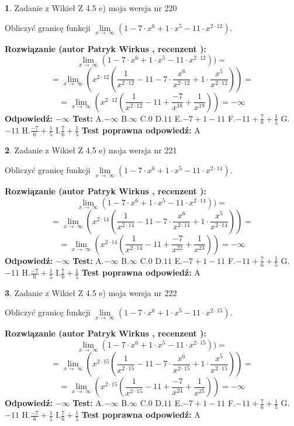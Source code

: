 \documentclass[12pt, a4paper]{article}
\theoremstyle{definition} %
\newtheorem{zad}{}
\newcommand{\zadStart}[1]{\begin{zad}#1\newline}
\newcommand{\zadStop}{\end{zad}}
\newcommand{\rozwStart}[2]{\noindent \textbf{Rozwiązanie (autor #1 , recenzent #2): }\newline}
\newcommand{\rozwStop}{\newline}
\newcommand{\odpStart}{\noindent \textbf{Odpowiedź:}\newline}
\newcommand{\odpStop}{\newline}
\newcommand{\testStart}{\noindent \textbf{Test:}\newline}
\newcommand{\testStop}{\newline}
\newcommand{\kluczStart}{\noindent \textbf{Test poprawna odpowiedź:}\newline}
\newcommand{\kluczStop}{\newline}
\begin{document}
\zadStart{Zadanie z Wikieł Z 4.5 e) moja wersja nr 220}



Obliczyć granicę funkcji  $\lim\limits_{x\to\ \infty}(1 - 7 \cdot x^{6}+1 \cdot x^{5}- 11 \cdot x^{2\cdot12})$.
\zadStop
\rozwStart{Patryk Wirkus}{}
$$\lim\limits_{x\to\ \infty}(1 - 7 \cdot x^{6}+1 \cdot x^{5}- 11 \cdot x^{2\cdot12}))=$$
$$=\lim\limits_{x\to\ \infty}(x^{2\cdot12}(\frac{1}{x^{2\cdot12}}-11 -7 \cdot \frac{x^{6}}{x^{2\cdot12}}+1 \cdot \frac{x^{5}}{x^{2\cdot12}}))=$$
$$=\lim\limits_{x\to\ \infty}(x^{2\cdot12}(\frac{1}{x^{2\cdot12}}-11 + \frac{-7}{x^{18}}+ \frac{1}{x^{19}}))=-\infty$$
\rozwStop
\odpStart
$-\infty$
\odpStop
\testStart
A.$-\infty$ B.$\infty$ C.$0$ D.$11$ E.$-7 + 1 - 11$
F.$-11+\frac{7}{6}+\frac{1}{5}$ G.$-11$
H.$\frac{-7}{6}+\frac{1}{5}$
I.$\frac{7}{6}+\frac{1}{5}$
\testStop
\kluczStart
A
\kluczStop



\zadStart{Zadanie z Wikieł Z 4.5 e) moja wersja nr 221}



Obliczyć granicę funkcji  $\lim\limits_{x\to\ \infty}(1 - 7 \cdot x^{6}+1 \cdot x^{5}- 11 \cdot x^{2\cdot14})$.
\zadStop
\rozwStart{Patryk Wirkus}{}
$$\lim\limits_{x\to\ \infty}(1 - 7 \cdot x^{6}+1 \cdot x^{5}- 11 \cdot x^{2\cdot14}))=$$
$$=\lim\limits_{x\to\ \infty}(x^{2\cdot14}(\frac{1}{x^{2\cdot14}}-11 -7 \cdot \frac{x^{6}}{x^{2\cdot14}}+1 \cdot \frac{x^{5}}{x^{2\cdot14}}))=$$
$$=\lim\limits_{x\to\ \infty}(x^{2\cdot14}(\frac{1}{x^{2\cdot14}}-11 + \frac{-7}{x^{22}}+ \frac{1}{x^{23}}))=-\infty$$
\rozwStop
\odpStart
$-\infty$
\odpStop
\testStart
A.$-\infty$ B.$\infty$ C.$0$ D.$11$ E.$-7 + 1 - 11$
F.$-11+\frac{7}{6}+\frac{1}{5}$ G.$-11$
H.$\frac{-7}{6}+\frac{1}{5}$
I.$\frac{7}{6}+\frac{1}{5}$
\testStop
\kluczStart
A
\kluczStop



\zadStart{Zadanie z Wikieł Z 4.5 e) moja wersja nr 222}



Obliczyć granicę funkcji  $\lim\limits_{x\to\ \infty}(1 - 7 \cdot x^{6}+1 \cdot x^{5}- 11 \cdot x^{2\cdot15})$.
\zadStop
\rozwStart{Patryk Wirkus}{}
$$\lim\limits_{x\to\ \infty}(1 - 7 \cdot x^{6}+1 \cdot x^{5}- 11 \cdot x^{2\cdot15}))=$$
$$=\lim\limits_{x\to\ \infty}(x^{2\cdot15}(\frac{1}{x^{2\cdot15}}-11 -7 \cdot \frac{x^{6}}{x^{2\cdot15}}+1 \cdot \frac{x^{5}}{x^{2\cdot15}}))=$$
$$=\lim\limits_{x\to\ \infty}(x^{2\cdot15}(\frac{1}{x^{2\cdot15}}-11 + \frac{-7}{x^{24}}+ \frac{1}{x^{25}}))=-\infty$$
\rozwStop
\odpStart
$-\infty$
\odpStop
\testStart
A.$-\infty$ B.$\infty$ C.$0$ D.$11$ E.$-7 + 1 - 11$
F.$-11+\frac{7}{6}+\frac{1}{5}$ G.$-11$
H.$\frac{-7}{6}+\frac{1}{5}$
I.$\frac{7}{6}+\frac{1}{5}$
\testStop
\kluczStart
A
\kluczStop
\end{document}
